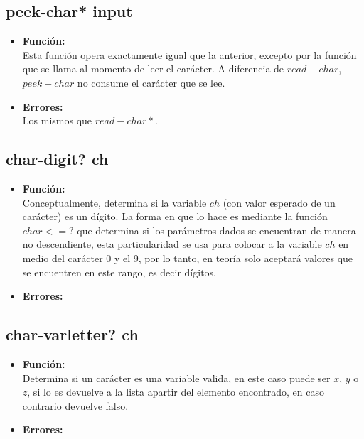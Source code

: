 \documentclass{article}
\begin{document}
\subsection{peek-char* input}
\begin{itemize}
    \item \textbf{Función:} \\
    Esta función opera exactamente igual que la anterior, excepto por la función que se llama al momento de leer el carácter. A diferencia de $read-char$, $peek-char$ no consume el carácter que se lee.
    \item \textbf{Errores:} \\ 
    Los mismos que $read-char*$.
\end{itemize}
\subsection{char-digit? ch}
\begin{itemize}
    \item \textbf{Función:} \\
    Conceptualmente, determina si la variable $ch$ (con valor esperado de un carácter) es un dígito. La forma en que lo hace es mediante la función $char<=?$ que determina si los parámetros dados se encuentran de manera no descendiente, esta particularidad se usa para colocar a la variable $ch$ en medio del carácter 0 y el 9, por lo tanto, en teoría solo aceptará valores que se encuentren en este rango, es decir dígitos.
    \item \textbf{Errores:} \\ 
\end{itemize}
\subsection{char-varletter? ch}
\begin{itemize}
    \item \textbf{Función:} \\
    Determina si un carácter es una variable valida, en este caso puede ser $x$, $y$ o $z$, si lo es devuelve a la lista apartir del elemento encontrado, en caso contrario devuelve falso.
    \item \textbf{Errores:} \\ 
\end{itemize}
\end{document}
